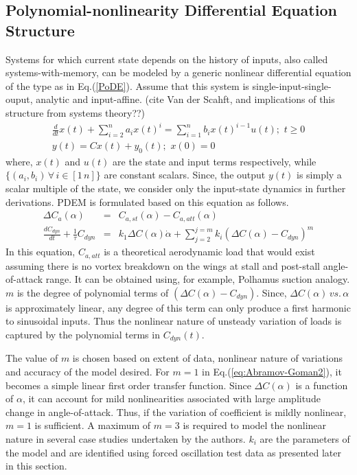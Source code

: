 \documentclass{AIAA}
\begin{document}
\subsection{Polynomial-nonlinearity Differential Equation Structure}
Systems for which current state depends on the history of inputs, also called systems-with-memory, can be modeled by a generic nonlinear differential equation of the type as in Eq.(\ref{PoDE}). Assume that this system is single-input-single-ouput, analytic and input-affine. (cite Van der Scahft, and implications of this structure from systems theory??)
\begin{eqnarray}
\label{PoDE}
\frac{d}{dt}x(t) + \sum_{i=2}^{n} a_{i} x(t)^{i} = \sum_{i=1}^{n} b_{i} x(t)^{i-1}u(t); \, \, t\geq0 \\ \nonumber
y(t)= C x(t)+y_0(t); \, \, x(0)=0
\end{eqnarray}
where, $x(t)$ and $u(t)$ are the state and input terms respectively, while $\{(a_i,b_i) \, \forall \, i \in [1 \, n]\}$ are constant scalars. Since, the output $y(t)$ is simply a scalar multiple of the state, we consider only the input-state dynamics in further derivations. PDEM is formulated based on this equation as follows.
 \begin{eqnarray}
\label{eq:Abramov-Goman2}
\Delta C_a(\alpha) &=& C_{a,st}(\alpha) - C_{a,att}(\alpha) \nonumber \\
\frac{d C_{dyn}}{dt} + \frac{1}{\tau} C_{dyn} &=& k_1 \Delta C(\alpha) \dot{\alpha} +  \sum_{j=2}^{j=m} k_i (\Delta C(\alpha) - C_{dyn})^m
\end{eqnarray} 
In this equation, $C_{a,att}$ is a theoretical aerodynamic load that would exist assuming there is no vortex breakdown on the wings at stall and post-stall angle-of-attack range. It can be obtained using, for example, Polhamus suction analogy. $m$ is the degree of polynomial terms of $(\Delta C(\alpha) - C_{dyn})$. Since, $\Delta C(\alpha) \, vs. \, \alpha$ is approximately linear, any degree of this term can only produce a first harmonic to sinusoidal inputs. Thus the nonlinear nature of unsteady variation of loads is captured by the polynomial terms in $C_{dyn}(t)$.

The value of $m$ is chosen based on extent of data, nonlinear nature of variations and accuracy of the model desired. 
For $m=1$ in Eq.(\ref{eq:Abramov-Goman2}), it becomes a simple linear first order transfer function. Since $\Delta C(\alpha)$ is a function of $\alpha$, it can account for mild nonlinearities associated with large amplitude change in angle-of-attack. Thus, if the variation of coefficient is mildly nonlinear, $m=1$ is sufficient. A maximum of $m=3$ is required to model the nonlinear nature in several case studies undertaken by the authors. $k_i$ are the parameters of the model and are identified using forced oscillation test data as presented later in this section.
\end{document}
